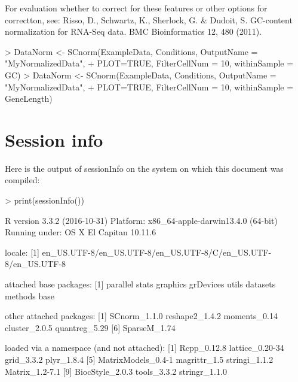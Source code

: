 \documentclass{article}
\begin{document}
For evaluation whether to correct for these features or other options for correctton, see: Risso, D., Schwartz, K., Sherlock, G. \& Dudoit, S. GC-content normalization for RNA-Seq data. BMC Bioinformatics 12, 480 (2011).

\begin{Schunk}
\begin{Sinput}
> DataNorm <- SCnorm(ExampleData, Conditions, OutputName = "MyNormalizedData",
+                      PLOT=TRUE, FilterCellNum = 10, withinSample = GC)
> DataNorm <- SCnorm(ExampleData, Conditions, OutputName = "MyNormalizedData",
+                      PLOT=TRUE, FilterCellNum = 10, withinSample = GeneLength)
\end{Sinput}
\end{Schunk}




\section{Session info}
Here is the output of sessionInfo on the system on which this document was compiled:
\begin{Schunk}
\begin{Sinput}
>   print(sessionInfo())
\end{Sinput}
\begin{Soutput}
R version 3.3.2 (2016-10-31)
Platform: x86_64-apple-darwin13.4.0 (64-bit)
Running under: OS X El Capitan 10.11.6

locale:
[1] en_US.UTF-8/en_US.UTF-8/en_US.UTF-8/C/en_US.UTF-8/en_US.UTF-8

attached base packages:
[1] parallel  stats     graphics  grDevices utils     datasets  methods   base     

other attached packages:
[1] SCnorm_1.1.0   reshape2_1.4.2 moments_0.14   cluster_2.0.5  quantreg_5.29 
[6] SparseM_1.74  

loaded via a namespace (and not attached):
 [1] Rcpp_0.12.8        lattice_0.20-34    grid_3.3.2         plyr_1.8.4        
 [5] MatrixModels_0.4-1 magrittr_1.5       stringi_1.1.2      Matrix_1.2-7.1    
 [9] BiocStyle_2.0.3    tools_3.3.2        stringr_1.1.0     
\end{Soutput}
\end{Schunk}
  
  \vspace{1cm}
%


%
\end{document}
